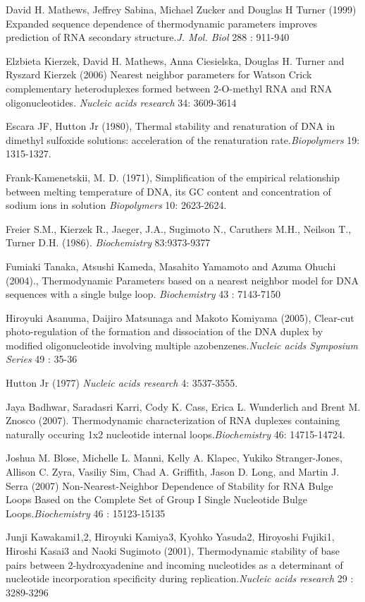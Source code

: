 \documentclass{article}
\begin{document}
David H. Mathews, Jeffrey Sabina, Michael Zucker and Douglas H Turner (1999)
Expanded sequence dependence of thermodynamic parameters improves prediction
of RNA secondary structure.\textit{J. Mol. Biol} 288 : 911-940

Elzbieta Kierzek, David H. Mathews, Anna Ciesielska, Douglas H. Turner and Ryszard Kierzek 
(2006) Nearest neighbor parameters for Watson Crick complementary heteroduplexes
formed between 2-O-methyl RNA and RNA oligonucleotides. \textit{Nucleic acids research} 
34: 3609-3614

Escara JF, Hutton Jr (1980), Thermal stability and renaturation of DNA in dimethyl sulfoxide
solutions: acceleration of the renaturation rate.\textit{Biopolymers} 19: 1315-1327.

Frank-Kamenetskii, M. D. (1971), Simplification of the empirical relationship between 
melting temperature of DNA, its GC content and concentration of sodium ions in solution
\textit{Biopolymers} 10: 2623-2624.

Freier S.M., Kierzek R., Jaeger, J.A., Sugimoto N., Caruthers M.H., Neilson T., Turner D.H.
(1986). \textit{Biochemistry} 
 83:9373-9377 
 
 Fumiaki Tanaka, Atsushi Kameda, Masahito Yamamoto and Azuma Ohuchi (2004)., Thermodynamic 
 Parameters based on a nearest neighbor model for DNA sequences with a single bulge loop.
\textit{Biochemistry} 43 : 7143-7150

Hiroyuki Asanuma, Daijiro Matsunaga and Makoto Komiyama (2005), Clear-cut photo-regulation 
of the formation and dissociation of the DNA duplex by modified oligonucleotide involving 
multiple azobenzenes.\textit{Nucleic acids Symposium Series} 49 : 35-36

Hutton Jr (1977) \textit{Nucleic acids research} 4: 3537-3555.

Jaya Badhwar, Saradasri Karri, Cody K. Cass, Erica L. Wunderlich and Brent M. Znosco (2007). 
Thermodynamic characterization of RNA duplexes containing naturally occuring 1x2 nucleotide 
internal loops.\textit{Biochemistry} 46: 14715-14724.

Joshua M. Blose, Michelle L. Manni, Kelly A. Klapec, Yukiko Stranger-Jones, Allison C.
Zyra, Vasiliy Sim, Chad A. Griffith, Jason D. Long, and Martin J. Serra (2007) 
Non-Nearest-Neighbor Dependence of Stability for RNA Bulge Loops Based on the Complete 
Set of Group I Single Nucleotide Bulge Loops.\textit{Biochemistry} 46 : 15123-15135

Junji Kawakami1,2, Hiroyuki Kamiya3, Kyohko Yasuda2, Hiroyoshi Fujiki1, Hiroshi Kasai3 and
Naoki Sugimoto (2001), Thermodynamic stability of base pairs between 2-hydroxyadenine and 
incoming nucleotides as a determinant of nucleotide incorporation specificity during 
replication.\textit{Nucleic acids research} 29 : 3289-3296
\end{document}
